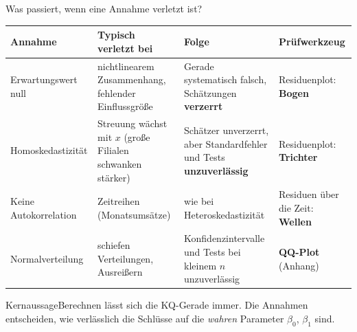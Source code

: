 \documentclass[aspectratio=169,11pt]{beamer}
\newcommand{\kernaussage}[1]{\begin{alertblock}{Kernaussage}#1\end{alertblock}}
\begin{document}
\begin{frame}{Was passiert, wenn eine Annahme verletzt ist?}
  \footnotesize
  \begin{center}
    \renewcommand{\arraystretch}{1.12}
    \begin{tabular}{@{}L{2.5cm} L{3.7cm} L{4.4cm} L{2.9cm}@{}}
      \toprule
      \textbf{Annahme} & \textbf{Typisch verletzt bei} & \textbf{Folge} & \textbf{Prüfwerkzeug} \\
      \midrule
      Erwartungswert null & nichtlinearem Zusammenhang, fehlender Einflussgröße
        & Gerade systematisch falsch, Schätzungen \textbf{verzerrt} & Residuenplot: \textbf{Bogen} \\
      Homo\-skedastizität & Streuung wächst mit $x$ (große Filialen schwanken stärker)
        & Schätzer unverzerrt, aber Standardfehler und Tests \textbf{unzuverlässig} & Residuenplot: \textbf{Trichter} \\
      Keine Auto\-korrelation & Zeitreihen (Monatsumsätze)
        & wie bei Heteroskedastizität & Residuen über die Zeit: \textbf{Wellen} \\
      Normal\-verteilung & schiefen Verteilungen, Ausreißern
        & Konfidenzintervalle und Tests bei kleinem $n$ unzuverlässig & \textbf{QQ-Plot} (Anhang) \\
      \bottomrule
    \end{tabular}
  \end{center}

  \kernaussage{Berechnen lässt sich die KQ-Gerade immer. Die Annahmen entscheiden,
    wie verlässlich die Schlüsse auf die \emph{wahren} Parameter $\beta_0$, $\beta_1$ sind.}
\end{frame}
\end{document}
